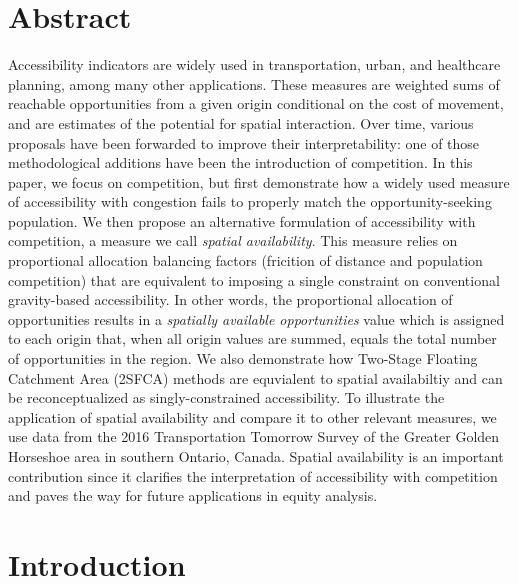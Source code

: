 \documentclass[10pt,letterpaper]{article}
\begin{document}
\section*{Abstract}
Accessibility indicators are widely used in transportation, urban, and
healthcare planning, among many other applications. These measures are
weighted sums of reachable opportunities from a given origin conditional
on the cost of movement, and are estimates of the potential for spatial
interaction. Over time, various proposals have been forwarded to improve
their interpretability: one of those methodological additions have been
the introduction of competition. In this paper, we focus on competition,
but first demonstrate how a widely used measure of accessibility with
congestion fails to properly match the opportunity-seeking population.
We then propose an alternative formulation of accessibility with
competition, a measure we call \emph{spatial availability}. This measure
relies on proportional allocation balancing factors (fricition of
distance and population competition) that are equivalent to imposing a
single constraint on conventional gravity-based accessibility. In other
words, the proportional allocation of opportunities results in a
\emph{spatially available opportunities} value which is assigned to each
origin that, when all origin values are summed, equals the total number
of opportunities in the region. We also demonstrate how Two-Stage
Floating Catchment Area (2SFCA) methods are equvialent to spatial
availabiltiy and can be reconceptualized as singly-constrained
accessibility. To illustrate the application of spatial availability and
compare it to other relevant measures, we use data from the 2016
Transportation Tomorrow Survey of the Greater Golden Horseshoe area in
southern Ontario, Canada. Spatial availability is an important
contribution since it clarifies the interpretation of accessibility with
competition and paves the way for future applications in equity
analysis.


\linenumbers

\newpage

\hypertarget{sec:introduction}{%
\section{Introduction}\label{sec:introduction}}
\end{document}
